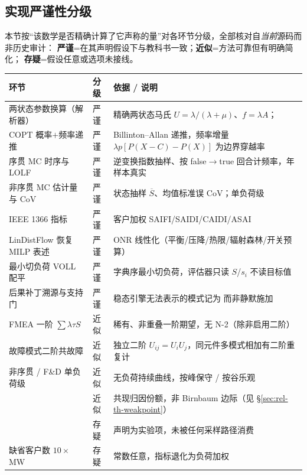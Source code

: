 \subsection{实现严谨性分级}\label{sec:rel-src-rigor}
本节按“该数学是否精确计算了它声称的量”对各环节分级，全部核对自\emph{当前}源码而非历史审计：
\textbf{严谨}=在其声明假设下与教科书一致；\textbf{近似}=方法可靠但有明确简化；
\textbf{存疑}=假设任意或选项未接线。
\begin{center}\footnotesize
\begin{tabular}{@{}L{5.0cm}L{1.7cm}L{8.9cm}@{}}
\toprule
环节 & 分级 & 依据 / 说明\\
\midrule
两状态参数换算（解析器）& 严谨 & 精确两状态马氏 $U=\lambda/(\lambda+\mu)$、$f=\lambda A$；\\
COPT 概率$+$频率递推 & 严谨 & Billinton--Allan 递推，频率增量 $\lambda p[P(X{-}C)-P(X)]$ 为边界穿越率\\
序贯 MC 时序与 LOLF & 严谨 & 逆变换指数抽样、按 false$\to$true 回合计频率，年样本真实\\
非序贯 MC 估计量与 CoV & 严谨\footnotemark[1] & 状态抽样 $\overline S$、均值标准误 CoV；单负荷级\\
IEEE 1366 指标 & 严谨 & 客户加权 SAIFI/SAIDI/CAIDI/ASAI\\
LinDistFlow 恢复 MILP 表述 & 严谨\footnotemark[2] & ONR 线性化（平衡/压降/热限/辐射森林/开关预算）\\
最小切负荷 VOLL 配平 & 严谨 & 字典序最小切负荷，评估器只读 $S$/$s_i$ 不读目标值\\
后果补丁溯源与支持门 & 严谨 & 稳态引擎无法表示的模式记为  而非静默施加\\
FMEA 一阶 $\sum\lambda\tau S$ & 近似 & 稀有、非重叠一阶期望，无 N-2（除非启用二阶）\\
故障模式二阶共故障 & 近似 & 独立二阶 $U_{ij}=U_iU_j$，同元件多模式相加有二阶重复计\\
非序贯 / F\&D 单负荷级 & 近似 & 无负荷持续曲线，按峰保守 / 按谷乐观\\
 & 近似 & 共现归因份额，非 Birnbaum 边际（见 \S\ref{sec:rel-th-weakpoint}）\\
 & 存疑 & 声明为实验项，未被任何采样路径消费\\
缺省客户数 $10\times$MW & 存疑 & 常数任意，指标退化为负荷加权\\
\bottomrule
\end{tabular}
\end{center}

